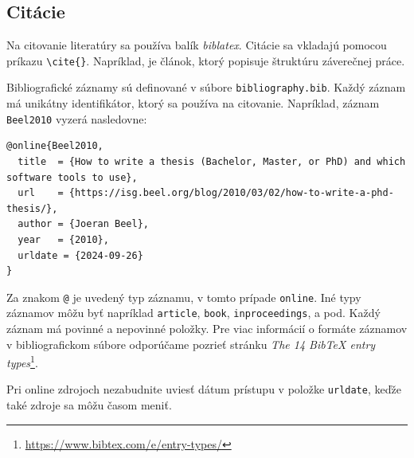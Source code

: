\subsection*{Citácie}

Na citovanie literatúry sa používa balík \emph{biblatex}. Citácie sa vkladajú pomocou príkazu \verb|\cite{}|. Napríklad, \cite{Beel2010} je článok, ktorý popisuje štruktúru záverečnej práce.

Bibliografické záznamy sú definované v súbore \texttt{bibliography.bib}. Každý záznam má unikátny identifikátor, ktorý sa používa na citovanie. Napríklad, záznam \texttt{Beel2010} vyzerá nasledovne:


\begin{lstlisting}[breaklines=true, prebreak=\mbox{\textcolor{red}{$\hookleftarrow$}}]
@online{Beel2010,
  title  = {How to write a thesis (Bachelor, Master, or PhD) and which software tools to use},
  url    = {https://isg.beel.org/blog/2010/03/02/how-to-write-a-phd-thesis/},
  author = {Joeran Beel},
  year   = {2010},
  urldate = {2024-09-26}
}
\end{lstlisting}

Za znakom \texttt{@} je uvedený typ záznamu, v tomto prípade \texttt{online}. Iné typy záznamov môžu byť napríklad \texttt{article}, \texttt{book}, \texttt{inproceedings}, a pod. Každý záznam má povinné a nepovinné položky. Pre viac informácií o formáte záznamov v bibliografickom súbore odporúčame pozrieť stránku \emph{The 14 BibTeX entry types}\footnote{\url{https://www.bibtex.com/e/entry-types/}}.

Pri online zdrojoch nezabudnite uviesť dátum prístupu v položke \texttt{urldate}, keďže také zdroje sa môžu časom meniť.
